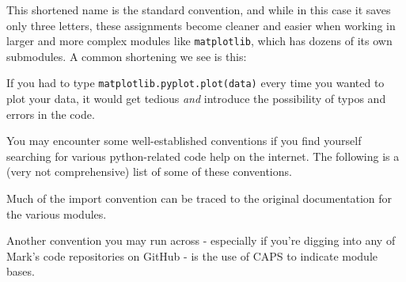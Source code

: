This shortened name is the standard convention, and while in this case
it saves only three letters, these assignments become cleaner and easier
when working in larger and more complex modules like
\texttt{matplotlib}, which has dozens of its own submodules. A common
shortening we see is this:

\begin{Shaded}
\begin{Highlighting}[]
\end{Highlighting}
\end{Shaded}

If you had to type \texttt{matplotlib.pyplot.plot(data)} every time you
wanted to plot your data, it would get tedious \emph{and} introduce the
possibility of typos and errors in the code.

You may encounter some well-established conventions if you find yourself
searching for various python-related code help on the internet. The
following is a (very not comprehensive) list of some of these
conventions.

\begin{Shaded}
\begin{Highlighting}[]
\end{Highlighting}
\end{Shaded}

Much of the import convention can be traced to the original
documentation for the various modules.

Another convention you may run across - especially if you're digging
into any of Mark's code repositories on GitHub - is the use of CAPS to
indicate module bases.

\begin{Shaded}
\begin{Highlighting}[]
\end{Highlighting}
\end{Shaded}

